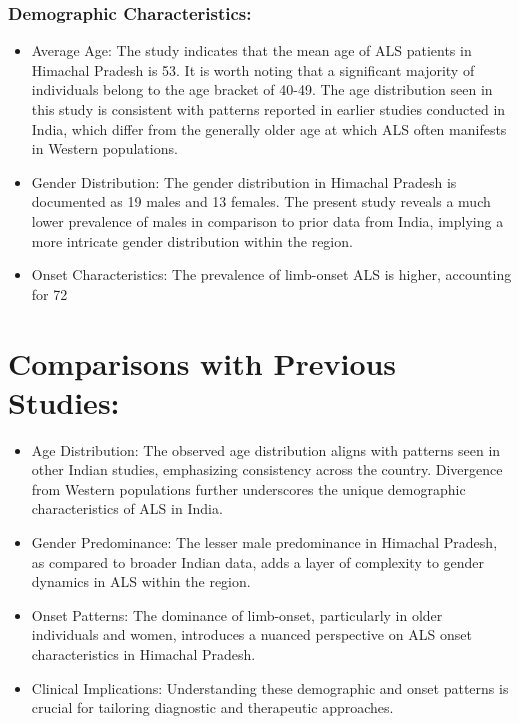 \documentclass[ 12pt,a4paper,twocolumn,fleqn]{report}
\begin{document}
\subsubsection{Demographic Characteristics:}
\vspace{2mm}
\begin{itemize}
    \item Average Age:
The study indicates that the mean age of ALS patients in Himachal Pradesh is 53. It is worth noting that a significant majority of individuals belong to the age bracket of 40-49. The age distribution seen in this study is consistent with patterns reported in earlier studies conducted in India, which differ from the generally older age at which ALS often manifests in Western populations.

\item Gender Distribution:
The gender distribution in Himachal Pradesh is documented as 19 males and 13 females. The present study reveals a much lower prevalence of males in comparison to prior data from India, implying a more intricate gender distribution within the region.

\item Onset Characteristics:
The prevalence of limb-onset ALS is higher, accounting for 72%


\end{itemize}
\section{Comparisons with Previous Studies:}
\vspace{2mm}
\begin{itemize}
    \item  Age Distribution:
The observed age distribution aligns with patterns seen in other Indian studies,
emphasizing consistency across the country. Divergence from Western populations
further underscores the unique demographic characteristics of ALS in India.
\item Gender Predominance:
The lesser male predominance in Himachal Pradesh, as compared to broader Indian data,
adds a layer of complexity to gender dynamics in ALS within the region.
\item Onset Patterns:
The dominance of limb-onset, particularly in older individuals and women, introduces
a nuanced perspective on ALS onset characteristics in Himachal Pradesh.
\item Clinical Implications:
Understanding these demographic and onset patterns is crucial for tailoring diagnostic
and therapeutic approaches.
\end{itemize}
\end{document}
